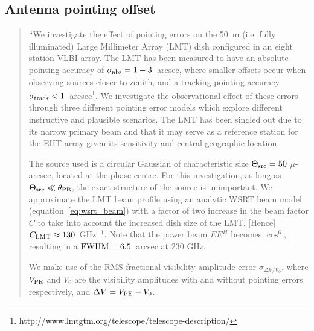 

\subsection{Antenna pointing offset}



\begin{quotation}
``We investigate the effect of pointing errors on the 50~m (i.e. fully illuminated) Large Millimeter Array (LMT) dish configured in an eight station VLBI array. The LMT has been measured to have an absolute pointing accuracy of $\sigma_{\rm abs} = 1-3$~arcsec, where smaller offsets occur when observing sources closer to zenith, and a tracking pointing accuracy $\sigma_{\rm track} < 1$~arcsec\footnote{http://www.lmtgtm.org/telescope/telescope-description/}. We investigate the observational effect of these errors through three different pointing error models which explore different instructive and plausible scenarios. The LMT has been singled out due to its narrow primary beam and that it may serve as a reference station for the EHT array given its sensitivity and central geographic location. 

The source used is a circular Gaussian of characteristic size $\Theta_{\rm src}=50$ $\mu$-arcsec, located at the phase centre. For this investigation, as long as $\Theta_{\rm src} \ll \theta_{\rm PB}$, the exact structure of the source is unimportant. We approximate the LMT beam profile using an analytic WSRT beam model (equation~\ref{eq:wsrt_beam}) with a factor of two increase in the beam factor $C$ to take into account the increased dish size of the LMT. [Hence] $C_{\rm LMT} \approx 130$~GHz$^{-1}$. Note that the power beam $EE^H$ becomes $\cos^6$, resulting in a $\rm{FWHM} = 6.5 $~arcsec at 230 GHz.


We make use of the RMS fractional visibility amplitude error $\sigma_{\Delta V/V_0}$, where $V_{\rm PE}$ and $V_{0}$ are the visibility amplitudes with and without pointing errors respectively, and  $\Delta V = V_{\rm PE} - V_{0}$.
\\
\citep{Blecher_2016}
\end{quotation}

